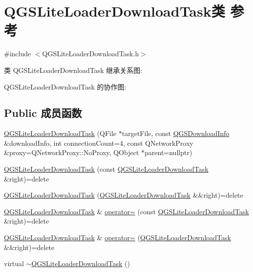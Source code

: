 \hypertarget{class_q_g_s_lite_loader_download_task}{}\section{Q\+G\+S\+Lite\+Loader\+Download\+Task类 参考}
\label{class_q_g_s_lite_loader_download_task}


{\ttfamily \#include $<$Q\+G\+S\+Lite\+Loader\+Download\+Task.\+h$>$}



类 Q\+G\+S\+Lite\+Loader\+Download\+Task 继承关系图\+:


Q\+G\+S\+Lite\+Loader\+Download\+Task 的协作图\+:
\subsection*{Public 成员函数}
\begin{DoxyCompactItemize}
\item 
\mbox{\hyperlink{class_q_g_s_lite_loader_download_task_af14c53b86bcbf90486107e7008ff7373}{Q\+G\+S\+Lite\+Loader\+Download\+Task}} (Q\+File $\ast$target\+File, const \mbox{\hyperlink{class_q_g_s_download_info}{Q\+G\+S\+Download\+Info}} \&download\+Info, int connection\+Count=4, const Q\+Network\+Proxy \&proxy=Q\+Network\+Proxy\+::\+No\+Proxy, Q\+Object $\ast$parent=nullptr)
\item 
\mbox{\hyperlink{class_q_g_s_lite_loader_download_task_a6ac2bd1ed30623ad676535aab698c964}{Q\+G\+S\+Lite\+Loader\+Download\+Task}} (const \mbox{\hyperlink{class_q_g_s_lite_loader_download_task}{Q\+G\+S\+Lite\+Loader\+Download\+Task}} \&right)=delete
\item 
\mbox{\hyperlink{class_q_g_s_lite_loader_download_task_ab1d89148de76a4d963addfc1252209e3}{Q\+G\+S\+Lite\+Loader\+Download\+Task}} (\mbox{\hyperlink{class_q_g_s_lite_loader_download_task}{Q\+G\+S\+Lite\+Loader\+Download\+Task}} \&\&right)=delete
\item 
\mbox{\hyperlink{class_q_g_s_lite_loader_download_task}{Q\+G\+S\+Lite\+Loader\+Download\+Task}} \& \mbox{\hyperlink{class_q_g_s_lite_loader_download_task_a8fa4ec37d4af2db696147b69d5526c74}{operator=}} (const \mbox{\hyperlink{class_q_g_s_lite_loader_download_task}{Q\+G\+S\+Lite\+Loader\+Download\+Task}} \&right)=delete
\item 
\mbox{\hyperlink{class_q_g_s_lite_loader_download_task}{Q\+G\+S\+Lite\+Loader\+Download\+Task}} \& \mbox{\hyperlink{class_q_g_s_lite_loader_download_task_a5a1a5ff51f40a65a3d751d76e9f60861}{operator=}} (\mbox{\hyperlink{class_q_g_s_lite_loader_download_task}{Q\+G\+S\+Lite\+Loader\+Download\+Task}} \&\&right)=delete
\item 
virtual \mbox{\hyperlink{class_q_g_s_lite_loader_download_task_a4325153c2ec97fb60f703e94a55a9668}{$\sim$\+Q\+G\+S\+Lite\+Loader\+Download\+Task}} ()
\end{DoxyCompactItemize}

